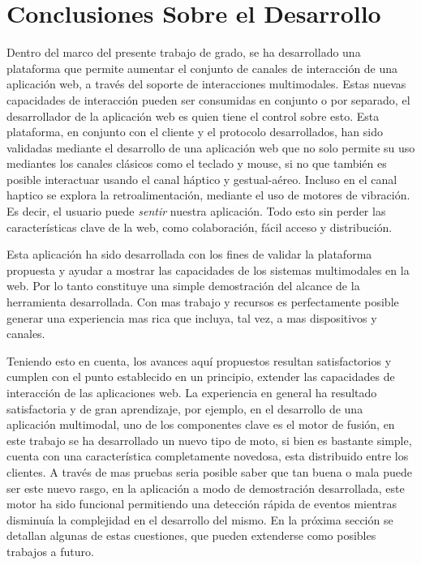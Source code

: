 \section{Conclusiones Sobre el Desarrollo} \label{sec:end_work}
Dentro del marco del presente trabajo de grado, se ha desarrollado una plataforma que permite aumentar el conjunto de canales de interacción de una aplicación web, a través del soporte de interacciones multimodales. Estas nuevas capacidades de interacción pueden ser consumidas en conjunto o por separado, el desarrollador de la aplicación web es quien tiene el control sobre esto. Esta plataforma, en conjunto con el cliente y el protocolo desarrollados, han sido validadas mediante el desarrollo de una aplicación web que no solo permite su uso mediantes los canales clásicos como el teclado y mouse, si no que también es posible interactuar usando el canal háptico y gestual-aéreo. Incluso en el canal haptico se explora la retroalimentación, mediante el uso de motores de vibración. Es decir, el usuario puede \emph{sentir} nuestra aplicación. Todo esto sin perder las características clave de la web, como colaboración, fácil acceso y distribución.

Esta aplicación ha sido desarrollada con los fines de validar la plataforma propuesta y ayudar a mostrar las capacidades de los sistemas multimodales en la web. Por lo tanto constituye una simple demostración del alcance de la herramienta desarrollada. Con mas trabajo y recursos es perfectamente posible generar una experiencia mas rica que incluya, tal vez, a mas dispositivos y canales. 

Teniendo esto en cuenta, los avances aquí propuestos resultan satisfactorios y cumplen con el punto establecido en un principio, extender las capacidades de interacción de las aplicaciones web. La experiencia en general ha resultado satisfactoria y de gran aprendizaje, por ejemplo, en el desarrollo de una aplicación multimodal, uno de los componentes clave es el motor de fusión, en este trabajo se ha desarrollado un nuevo tipo de moto, si bien es bastante simple, cuenta con una característica completamente novedosa, esta distribuido entre los clientes. A través de mas pruebas seria posible saber que tan buena o mala puede ser este nuevo rasgo, en la aplicación a modo de demostración desarrollada, este motor ha sido funcional permitiendo una detección rápida de eventos mientras disminuía la complejidad en el desarrollo del mismo. En la próxima sección se detallan algunas de estas cuestiones, que pueden extenderse como posibles trabajos a futuro.

